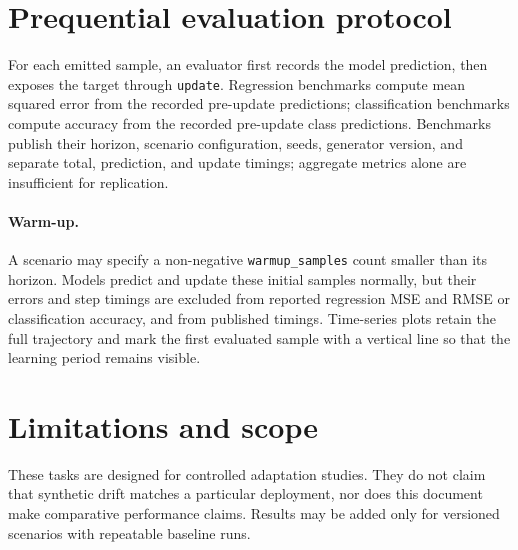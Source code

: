 \documentclass[11pt]{article}
\begin{document}
\section{Prequential evaluation protocol}
For each emitted sample, an evaluator first records the model prediction, then
exposes the target through \texttt{update}.  Regression benchmarks compute
mean squared error from the recorded pre-update predictions; classification
benchmarks compute accuracy from the recorded pre-update class predictions.
Benchmarks publish their horizon, scenario configuration, seeds, generator
version, and separate total, prediction, and update timings; aggregate
metrics alone are insufficient for replication.

\paragraph{Warm-up.}
A scenario may specify a non-negative \texttt{warmup\_samples} count smaller
than its horizon.  Models predict and update these initial samples normally,
but their errors and step timings are excluded from reported regression MSE
and RMSE or classification accuracy, and from published timings.
Time-series plots retain the full trajectory and
mark the first evaluated sample with a vertical line so that the learning period
remains visible.

\section{Limitations and scope}
These tasks are designed for controlled adaptation studies.  They do not claim
that synthetic drift matches a particular deployment, nor does this document
make comparative performance claims.  Results may be added only for versioned
scenarios with repeatable baseline runs.
\end{document}
